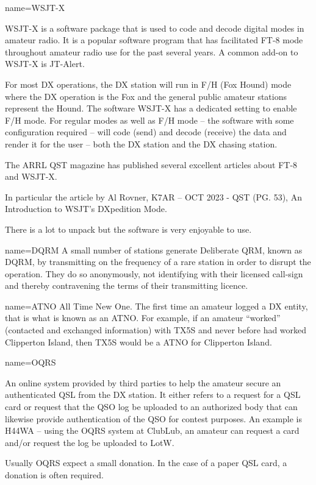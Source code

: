  { name={{WSJT-X}} }
{WSJT-X is a software package that is used to code and decode 
digital modes in amateur radio.  It is a popular software program
that has facilitated FT-8 mode throughout amateur radio use for the 
past several years.   A common add-on to WSJT-X is JT-Alert.
\par
For most DX operations, the DX station will run in F/H (Fox Hound)
mode where the DX operation is the Fox and the general public
amateur stations represent the Hound.   The software WSJT-X has a 
dedicated setting to enable F/H mode.   For regular modes
as well as F/H mode -- the software with some configuration required --
will code (send) and decode (receive) the data and render it for the
user -- both the DX station and the DX chasing station.
\par
The ARRL QST magazine has published several excellent articles about
FT-8 and WSJT-X.
\par
In particular the article by Al Rovner, K7AR --
OCT 2023 - QST (PG. 53),
An Introduction to WSJT's DXpedition Mode. 
\par
There is a lot to unpack but the software is very enjoyable to use.
}

 { name={{DQRM}} }
{
A small number of stations generate Deliberate QRM, known as DQRM, by transmitting on the frequency of a rare station in order to disrupt the operation. They do so anonymously, not identifying with their licensed call-sign and thereby contravening the terms of their transmitting licence.
}

 { name={{ATNO}} }
{All Time New One.  The first time an amateur logged
a DX entity, that is what is known as an ATNO.  For example,
if an amateur ``worked'' (contacted and exchanged information)
with TX5S and never before had worked Clipperton Island, then TX5S
would be a ATNO for Clipperton Island.}

 { name={{OQRS}} }
{ An online system provided by third parties to help
the amateur secure an authenticated QSL from the DX station.
It either refers to a request for a QSL card or request that the QSO
log be uploaded to an authorized body that can likewise provide
authentication of the QSO for contest purposes.  An example
is H44WA -- using the OQRS system at ClubLub, an amateur can
request a card and/or request the log be uploaded to LotW.  
\par
Usually OQRS expect a small donation.  In the case of a paper QSL
card, a donation is often required.}

